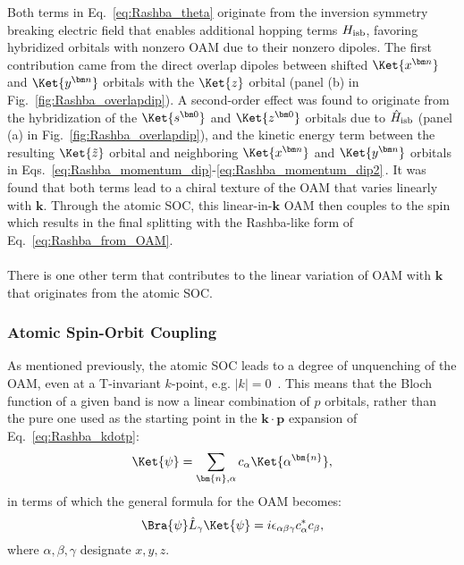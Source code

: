 Both terms in Eq.~\eqref{eq:Rashba_theta} originate from the inversion symmetry breaking electric field that enables additional hopping terms $H_{\rm isb}$, favoring hybridized orbitals with nonzero OAM due to their nonzero dipoles. 
The first contribution came from the direct overlap dipoles between shifted $\Ket{x^{\bm n}}$ and $\Ket{y^{\bm n}}$ orbitals with the $\Ket{z}$ orbital (panel (b) in Fig.~\ref{fig:Rashba_overlapdip})\cite{Petersen2000}.
A second-order effect was found to originate from the hybridization of the $\Ket{s^{\bm 0}}$ and $\Ket{z^{\bm 0}}$ orbitals due to $\hat H_{\rm isb}$ (panel (a) in Fig.~\ref{fig:Rashba_overlapdip}), and the kinetic energy term between the resulting $\Ket{\tilde z}$ orbital and neighboring $\Ket{x^{\bm n}}$ and $\Ket{y^{\bm n}}$ orbitals in Eqs.~\eqref{eq:Rashba_momentum_dip}-\eqref{eq:Rashba_momentum_dip2}\,\cite{Go2016}.
It was found that both terms lead to a chiral texture of the OAM that varies linearly with $\bm k$.
Through the atomic SOC, this linear-in-$\bm k$ OAM then couples to the spin which results in the final splitting with the Rashba-like form of Eq.~\eqref{eq:Rashba_from_OAM}.
\\\\
There is one other term that contributes to the linear variation of OAM with $\bm{k}$ that originates from the atomic SOC.

\subsubsection{Atomic Spin-Orbit Coupling \label{sec:Rashba_SOC_part}}
As mentioned previously, the atomic SOC leads to a degree of unquenching of the OAM, even at a T-invariant $k$-point, e.g. $|k|=0$~\cite{Park2011,Park2012,Park2015}.
This means that the Bloch function of a given band is now a linear combination of $p$ orbitals, rather than the pure one used as the starting point in the $\bm k \cdot \bm p$ expansion of Eq.~\eqref{eq:Rashba_kdotp}:
\begin{equation}
\Ket{\psi} = \sum_{\bm{n},\alpha} c_\alpha \Ket{\alpha^{\bm{n}}},
\end{equation}
in terms of which the general formula for the OAM becomes:
\begin{equation}
	\Bra{\psi}\hat L_{\gamma}\Ket{\psi}= i \epsilon_{\alpha \beta \gamma} c^*_\alpha c_\beta,
\end{equation}
where $\alpha,\beta,\gamma$ designate $x,y,z$.

